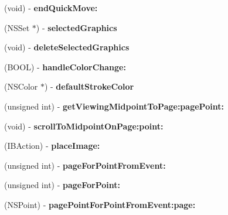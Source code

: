 \begin{DoxyCompactItemize}
(void) -\/ {\bfseries end\+Quick\+Move\+:}
\item 
\mbox{\label{interface_f_p_document_view_a5d8baa44dc1d229d02f2d99090ccaef9}} 
(N\+S\+Set $\ast$) -\/ {\bfseries selected\+Graphics}
\item 
\mbox{\label{interface_f_p_document_view_aea463b57a47d78a110e443b7e342e23e}} 
(void) -\/ {\bfseries delete\+Selected\+Graphics}
\item 
\mbox{\label{interface_f_p_document_view_a23596bfa0d490f80f5a0871d94bab2ac}} 
(B\+O\+OL) -\/ {\bfseries handle\+Color\+Change\+:}
\item 
\mbox{\label{interface_f_p_document_view_af9ec9129b31219115ac3deec02bb91c8}} 
(N\+S\+Color $\ast$) -\/ {\bfseries default\+Stroke\+Color}
\item 
\mbox{\label{interface_f_p_document_view_a670fea83332b18eed7a63ca3eb692f18}} 
(unsigned int) -\/ {\bfseries get\+Viewing\+Midpoint\+To\+Page\+:page\+Point\+:}
\item 
\mbox{\label{interface_f_p_document_view_a6c077a222f560339e73e74e138f24b8e}} 
(void) -\/ {\bfseries scroll\+To\+Midpoint\+On\+Page\+:point\+:}
\item 
\mbox{\label{interface_f_p_document_view_aa787d68fc05684c45dde968af39b97c0}} 
(I\+B\+Action) -\/ {\bfseries place\+Image\+:}
\item 
\mbox{\label{interface_f_p_document_view_a412bd56a7d42c2a9a583bd3acb089ecc}} 
(unsigned int) -\/ {\bfseries page\+For\+Point\+From\+Event\+:}
\item 
\mbox{\label{interface_f_p_document_view_a54fd392628e1b5156d330e9b20023255}} 
(unsigned int) -\/ {\bfseries page\+For\+Point\+:}
\item 
\mbox{\label{interface_f_p_document_view_a73a45e37ab0b53af326cc57338240642}} 
(N\+S\+Point) -\/ {\bfseries page\+Point\+For\+Point\+From\+Event\+:page\+:}

\end{DoxyCompactItemize}

